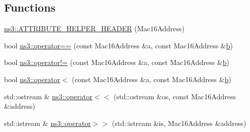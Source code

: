 \subsection*{Functions}
\begin{DoxyCompactItemize}
\item 
\hyperlink{namespacens3_af5ce9a720f919ff0b5e8fd3a5f6d5b69}{ns3\+::\+A\+T\+T\+R\+I\+B\+U\+T\+E\+\_\+\+H\+E\+L\+P\+E\+R\+\_\+\+H\+E\+A\+D\+ER} (Mac16\+Address)
\item 
bool \hyperlink{namespacens3_a2c3ab8065f744a5d713fc93bf2a82fff}{ns3\+::operator==} (const Mac16\+Address \&a, const Mac16\+Address \&\hyperlink{lte__pathloss_8m_a21ad0bd836b90d08f4cf640b4c298e7c}{b})
\item 
bool \hyperlink{namespacens3_ae4af0c3a04621708bb59923a45d784c0}{ns3\+::operator!=} (const Mac16\+Address \&a, const Mac16\+Address \&\hyperlink{lte__pathloss_8m_a21ad0bd836b90d08f4cf640b4c298e7c}{b})
\item 
bool \hyperlink{namespacens3_adf11174dd0ca96a1cfddc7a9daab5e9f}{ns3\+::operator$<$} (const Mac16\+Address \&a, const Mac16\+Address \&\hyperlink{lte__pathloss_8m_a21ad0bd836b90d08f4cf640b4c298e7c}{b})
\item 
std\+::ostream \& \hyperlink{namespacens3_a588376fa9b92fceb93a3ec4cdffc8cd7}{ns3\+::operator$<$$<$} (std\+::ostream \&os, const Mac16\+Address \&address)
\item 
std\+::istream \& \hyperlink{namespacens3_a088bcc69d13c65e904b4c3aded24f774}{ns3\+::operator$>$$>$} (std\+::istream \&is, Mac16\+Address \&address)
\end{DoxyCompactItemize}
